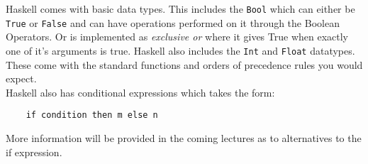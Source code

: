 Haskell comes with basic data types. This includes the \verb|Bool| which can either be \verb|True| or \verb|False| and can have operations performed on it through the Boolean Operators. Or is implemented as \textit{exclusive or} where it gives True when exactly one of it's arguments is true. Haskell also includes the \verb|Int| and \verb|Float| datatypes. These come with the standard functions and orders of precedence rules you would expect. \\

Haskell also has conditional expressions which takes the form:
\begin{verbatim}
    if condition then m else n
\end{verbatim}
More information will be provided in the coming lectures as to alternatives to the if expression. 